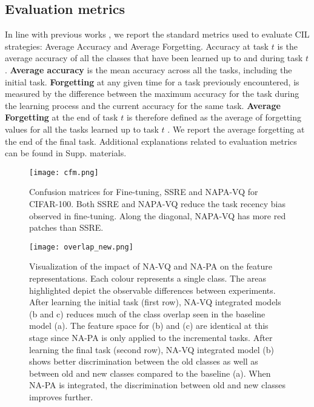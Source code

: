 \documentclass[10pt,twocolumn,letterpaper]{article}
\begin{document}
\subsection{Evaluation metrics}
In line with previous works \cite{Zhu2021PrototypeLearning,Zhu2022Self-SustainingLearning}, we report the standard metrics used to evaluate CIL strategies: Average Accuracy and Average Forgetting. Accuracy at task $t$ is the average accuracy of all the classes that have been learned up to and during task $t$. 
\textbf{Average accuracy} \cite{Chaudhry2018RiemannianIntransigence} is the mean accuracy across all the tasks, including the initial task. \textbf{Forgetting} at any given time for a task previously encountered, is measured by the difference between the maximum accuracy for the task during the learning process and the current accuracy for the same task. \textbf{Average Forgetting} at the end of task $t$ is therefore defined as the average of forgetting values for all the tasks learned up to task $t$ \cite{Chaudhry2018RiemannianIntransigence}. 
We report the average forgetting at the end of the final task. Additional explanations related to evaluation metrics can be found in Supp. materials.

\begin{figure}[t]
\centering
\texttt{[image: cfm.png]}
\caption{Confusion matrices for Fine-tuning, SSRE and NAPA-VQ for CIFAR-100. Both SSRE and NAPA-VQ reduce the task recency bias observed in fine-tuning. Along the diagonal, NAPA-VQ has more red patches than SSRE.}
\label{fig:cfm}
\end{figure}

\begin{figure*}[t]
\centering
\texttt{[image: overlap\_new.png]}
\caption{Visualization of the impact of NA-VQ and NA-PA on the feature representations. Each colour represents a single class. The areas highlighted depict the observable differences between experiments. After learning the initial task (first row), NA-VQ integrated models (b and c) reduces much of the class overlap seen in the baseline model (a). The feature space for (b) and (c) are identical at this stage since NA-PA is only applied to the incremental tasks. After learning the final task (second row), NA-VQ integrated model (b) shows better discrimination between the old classes as well as between old and new classes compared to the baseline (a). When NA-PA is integrated, the discrimination between old and new classes improves further. 
}
\label{fig:overlap}
\end{figure*} 
\end{document}
